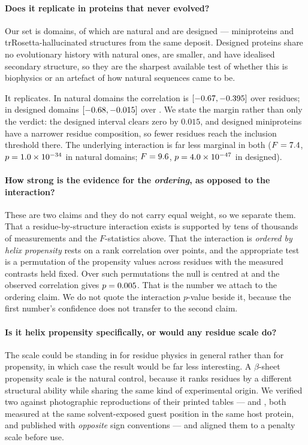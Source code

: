 \documentclass[11pt]{article}
\begin{document}
\paragraph{Does it replicate in proteins that never evolved?} Our set is \Ndom{} domains, of
which \NNatDom{} are natural and \NDesDom{} are designed --- miniproteins and
trRosetta-hallucinated structures from the same deposit. Designed proteins share no
evolutionary history with natural ones, are smaller, and have idealised secondary structure, so
they are the sharpest available test of whether this is biophysics or an artefact of how natural
sequences came to be.

It replicates. In natural domains the correlation is \RhoNat{} $[-0.67{}, -0.395{}]$ over
\NResNat{} residues; in designed domains \RhoDes{} $[-0.68{}, -0.015{}]$ over \NResDes{}.
We state the margin rather than only the verdict: the designed interval clears zero by
$0.015$, and designed miniproteins have a narrower residue composition, so fewer residues
reach the inclusion threshold there. The underlying interaction is far less marginal in both
($F = 7.4{}$, $p = 1.0\times10^{-34}{}$ in natural domains; $F = 9.6{}$, $p = 4.0\times10^{-47}{}$ in designed).

\paragraph{How strong is the evidence for the \emph{ordering}, as opposed to the interaction?}
These are two claims and they do not carry equal weight, so we separate them. That a
residue-by-structure interaction exists is supported by tens of thousands of measurements and
the $F$-statistics above. That the interaction is \emph{ordered by helix propensity} rests on a
rank correlation over \NresContrast{} points, and the appropriate test is a permutation of the
propensity values across residues with the measured contrasts held fixed. Over \PermN{} such
permutations the null is centred at \PermMean{} and the observed correlation gives
$p = 0.005{}$. That is the number we attach to the ordering claim. We do not quote the
interaction $p$-value beside it, because the first number's confidence does not transfer to the
second claim.

\paragraph{Is it helix propensity specifically, or would any residue scale do?} The scale
could be standing in for residue physics in general rather than for propensity, in which
case the result would be far less interesting. A $\beta$-sheet propensity scale is the
natural control, because it ranks residues by a different structural ability while sharing
the same kind of experimental origin. We verified two against photographic reproductions
of their printed tables --- \citet{minorkim1994a} and \citet{smith1994}, both measured at
the same solvent-exposed guest position in the same host protein, and published with
\emph{opposite} sign conventions --- and aligned them to a penalty scale before use.
\end{document}
